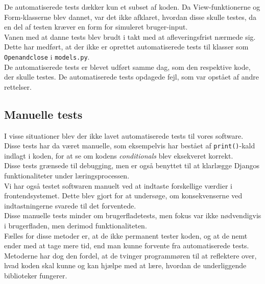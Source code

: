\documentclass[]{article}
\begin{document}
\indent De automatiserede tests dækker kun et subset af koden. Da View-funktionerne og Form-klasserne blev dannet, var det ikke afklaret, hvordan disse skulle testes, da en del af testen kræver en form for simuleret bruger-input. \\
Vanen med at danne tests blev brudt i takt med at afleveringsfrist nærmede sig. Dette har medført, at der ikke er oprettet automatiserede tests til klasser som \texttt{Openandclose} i \texttt{models.py}. \\
\indent De automatiserede tests er blevet udført samme dag, som den respektive kode, der skulle testes. De automatiserede tests opdagede fejl, som var opstået af andre rettelser. 

\subsection{Manuelle tests} \label{ManuelleTests}
I visse situationer blev der ikke lavet automatiserede tests til vores software. Disse tests har da været manuelle, som eksempelvis har bestået af \texttt{print()}-kald indlagt i koden, for at se om kodens \textit{conditionals} blev eksekveret korrekt. \\
Disse tests grænsede til debugging, men er også benyttet til at klarlægge Djangos funktionaliteter under læringsprocessen. \\
\indent Vi har også testet softwaren manuelt ved at indtaste forskellige værdier i frontendsystemet. Dette blev gjort for at undersøge, om konsekvenserne ved indtastningerne svarede til det forventede. \\
Disse manuelle tests minder om brugerfladetests, men fokus var ikke nødvendigvis i brugerfladen, men derimod funktionaliteten. \\
Fælles for disse metoder er, at de ikke permanent tester koden, og at de nemt ender med at tage mere tid, end man kunne forvente fra automatiserede tests. Metoderne har dog den fordel, at de tvinger programmøren til at reflektere over, hvad koden skal kunne og kan hjælpe med at lære, hvordan de underliggende biblioteker fungerer.
\end{document}
